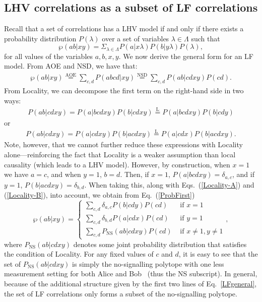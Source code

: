 \documentclass[aps,prx,twocolumn,superscriptaddress]{revtex4-1}
\theoremstyle{plain}
\begin{document}
\subsection{LHV correlations as a subset of LF correlations}\label{subset_section}

Recall that a set of correlations has a LHV model if and only if there exists a probability distribution $P(\lambda)$ over a set of variables $\lambda \in \Lambda$ such that
\begin{equation}
\label{separable}
\wp(ab|xy)=\Sigma_{\lambda\in\Lambda} P(a|x\lambda)P(b|y\lambda)P(\lambda),
\end{equation}
for all values of the variables $a,b,x,y$. We now derive the general form for an LF model. From AOE and NSD, we have that:
\begin{eqnarray}
\label{ProbFirst}
\wp(ab|xy) {\stackrel{\text{{AOE}}}{=}} \sum_{c,d}P(abcd|xy) 
         {\stackrel{\text{{NSD}}}{=}} \sum_{c,d}P(ab|cdxy)P(cd).
\end{eqnarray}
From {Locality}, we can decompose the first term on the right-hand side in two ways:
\begin{eqnarray}
\label{Locality-A}
P(ab|cdxy)= P(a|bcdxy)P(b|cdxy) 
        { \stackrel{\text{{L}}}{=} } P(a|bcdxy)P(b|cdy)
\end{eqnarray}
or
\begin{eqnarray}
\label{Locality-B}
P(ab|cdxy)= P(a|cdxy)P(b|acdxy) 
        { \stackrel{\text{{L}}}{=} } P(a|cdx)P(b|acdxy).
\end{eqnarray}
Note, however, that we cannot further reduce these expressions with {Locality} alone---reinforcing the fact that {Locality} is a weaker assumption than local causality (which leads to a LHV model). However, by construction, when $x=1$ we have $a=c$, and when $y=1$, $b=d$. Then, if $x=1$, $P(a|bcdxy)=\delta_{a,c}$, and if $y=1$, $P(b|acdxy)=\delta_{b,d}$. When taking this, along with Eqs.~(\ref{Locality-A}) and (\ref{Locality-B}), into account, we obtain from Eq.~(\ref{ProbFirst})
\begin{equation}
\label{LFgeneral}
\wp(ab|xy)=\begin{cases}
\sum_{c,d}\delta_{a,c}P(b|cdy)P(cd) & \text{ if } x=1 \\ 
\sum_{c,d}\delta_{b,d}P(a|cdx)P(cd) & \text{ if } y=1 \\ 
\sum_{c,d}P_{\mathrm{NS}}(ab|cdxy)P(cd) & \text{ if } x\neq1, y\neq1
\end{cases},
\end{equation}
where $P_{\mathrm{NS}}(ab|cdxy)$ denotes some joint probability distribution that satisfies the condition of {Locality}. For any fixed values of $c$ and $d$, it is easy to see that the set of $P_{\mathrm{NS}}(ab|cdxy)$ is simply the no-signalling polytope with one less measurement setting for both Alice and Bob~\cite{Barrett05} (thus the NS subscript). In general, because of the additional structure given by the first two lines of Eq.~\eqref{LFgeneral}, the set of LF correlations only forms a subset of the no-signalling polytope.
\end{document}

